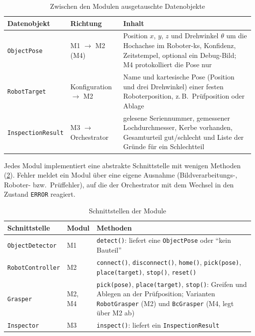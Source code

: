 \begin{table}[htbp]
  \centering
  \caption{Zwischen den Modulen ausgetauschte Datenobjekte}
  \label{tab:datenobjekte}
  \begin{tabularx}{\textwidth}{@{}l l X@{}}
    \toprule
    Datenobjekt & Richtung & Inhalt \\
    \midrule
    \texttt{ObjectPose} & M1 $\rightarrow$ M2 (M4) &
      Position $x$, $y$, $z$ und Drehwinkel $\theta$ um die Hochachse im Roboter-\ac{ks},
      Konfidenz, Zeitstempel, optional ein Debug-Bild; M4 protokolliert die Pose nur \\
    \texttt{RobotTarget} & Konfiguration $\rightarrow$ M2 &
      Name und kartesische Pose (Position und drei Drehwinkel) einer festen Roboterposition,
      z.\,B.\ Prüfposition oder Ablage \\
    \texttt{InspectionResult} & M3 $\rightarrow$ Orchestrator &
      gelesene Seriennummer, gemessener Lochdurchmesser, Kerbe vorhanden, Gesamturteil
      gut/schlecht und Liste der Gründe für ein Schlechtteil \\
    \bottomrule
  \end{tabularx}
\end{table}

Jedes Modul implementiert eine abstrakte Schnittstelle mit wenigen Methoden
(\cref{tab:modulschnittstellen}). Fehler meldet ein Modul über eine eigene Ausnahme
(Bildverarbeitungs-, Roboter- bzw.\ Prüffehler), auf die der Orchestrator mit dem Wechsel in
den Zustand \texttt{ERROR} reagiert.

\begin{table}[htbp]
  \centering
  \caption{Schnittstellen der Module}
  \label{tab:modulschnittstellen}
  \begin{tabularx}{\textwidth}{@{}l l X@{}}
    \toprule
    Schnittstelle & Modul & Methoden \\
    \midrule
    \texttt{ObjectDetector} & M1 & \texttt{detect()}: liefert eine \texttt{ObjectPose} oder
      \enquote{kein Bauteil} \\
    \texttt{RobotController} & M2 & \texttt{connect()}, \texttt{disconnect()}, \texttt{home()},
      \texttt{pick(pose)}, \texttt{place(target)}, \texttt{stop()}, \texttt{reset()} \\
    \texttt{Grasper} & M2, M4 & \texttt{pick(pose)}, \texttt{place(target)}, \texttt{stop()}:
      Greifen und Ablegen an der Prüfposition; Varianten \texttt{RobotGrasper} (M2) und
      \texttt{BcGrasper} (M4, legt über M2 ab) \\
    \texttt{Inspector} & M3 & \texttt{inspect()}: liefert ein \texttt{InspectionResult} \\
    \bottomrule
  \end{tabularx}
\end{table}

